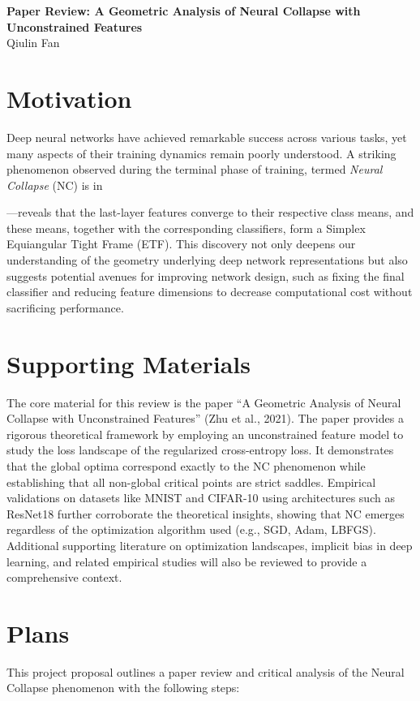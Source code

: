 \documentclass[11pt]{article}
\begin{document}
\begin{center}
    {\LARGE \textbf{Paper Review: A Geometric Analysis of Neural Collapse with Unconstrained Features\cite{zhu2021geometricanalysisneuralcollapse} }} \\
    \vspace{1.5em} %
    {\large Qiulin Fan} \\
\end{center}


\section{Motivation}
Deep neural networks have achieved remarkable success across various tasks, yet many aspects of their training dynamics remain poorly understood. A striking phenomenon observed during the terminal phase of training, termed \emph{Neural Collapse} (NC) is in

—reveals that the last-layer features converge to their respective class means, and these means, together with the corresponding classifiers, form a Simplex Equiangular Tight Frame (ETF). This discovery not only deepens our understanding of the geometry underlying deep network representations but also suggests potential avenues for improving network design, such as fixing the final classifier and reducing feature dimensions to decrease computational cost without sacrificing performance.

\section{Supporting Materials}
The core material for this review is the paper “A Geometric Analysis of Neural Collapse with Unconstrained Features” (Zhu et al., 2021). The paper provides a rigorous theoretical framework by employing an unconstrained feature model to study the loss landscape of the regularized cross-entropy loss. It demonstrates that the global optima correspond exactly to the NC phenomenon while establishing that all non-global critical points are strict saddles. Empirical validations on datasets like MNIST and CIFAR-10 using architectures such as ResNet18 further corroborate the theoretical insights, showing that NC emerges regardless of the optimization algorithm used (e.g., SGD, Adam, LBFGS). Additional supporting literature on optimization landscapes, implicit bias in deep learning, and related empirical studies will also be reviewed to provide a comprehensive context.

\section{Plans}
This project proposal outlines a paper review and critical analysis of the Neural Collapse phenomenon with the following steps:
\end{document}
